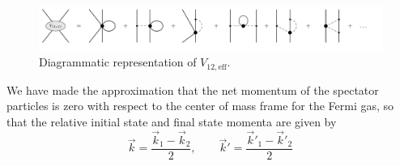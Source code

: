 \documentclass[%
 preprint,
 amsmath,amssymb,
 aps,
]{revtex4-1}
\begin{document}
\begin{figure}
\includegraphics[scale=0.6,page=1]{Figures/InMediumDiagrams2}
\caption{\label{fig:eff-diagram} Diagrammatic representation of $V_{12,\text{eff}}$.}
\end{figure}
 We have made the approximation that the net momentum of the spectator particles is zero with respect to the center of mass frame for the Fermi gas, so that the relative initial state and final state momenta are given by
 \begin{equation}
 \vec{k}=\frac{\vec{k}_1-\vec{k}_2}{2},\qquad \vec{k}'=\frac{\vec{k}'_1-\vec{k}'_2}{2}
 \end{equation}
 
\end{document}
